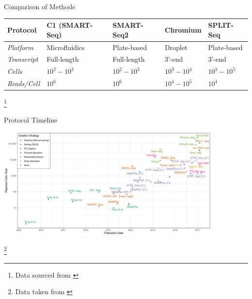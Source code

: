 \documentclass[aspectratio=169,11pt]{beamer}
\newcommand\blfootnote[1]{%
  \begingroup
  \renewcommand\thefootnote{}\footnote{#1}%
  \addtocounter{footnote}{-1}%
  \endgroup
}
\begin{document}
\begin{frame}{Comparison of Methods}

	\begin{center}
	
		\small
		\begin{tabular}{l|llll}
			\textbf{Protocol} & \textbf{C1 (SMART-Seq)} & \textbf{SMART-Seq2} & \textbf{Chromium} & \textbf{SPLIT-Seq}\\
			\midrule
			\textit{Platform} & Microfluidics & Plate-based & Droplet & Plate-based\\
			\textit{Transcript} & Full-length & Full-length & 3'-end & 3'-end\\
			\textit{Cells} & $10^2 - 10^3$ & $10^2 - 10^3$ & $10^3-10^4$ & $10^3 - 10^5$\\
			\textit{Reads/Cell} & $10^6$ & $10^6$ & $10^4-10^5$ & $10^4$\\
			\bottomrule
		\end{tabular}

	\end{center}

	\blfootnote{Data sourced from \cite{pmid28821273}}

\end{frame}

\begin{frame}{Protocol Timeline}

	\begin{center}
		\includegraphics[width=0.85\textwidth]{figures/scRNATimeline.pdf} 
	\end{center}

	\blfootnote{Data taken from \cite{pmid29494575}}

\end{frame}
\end{document}
